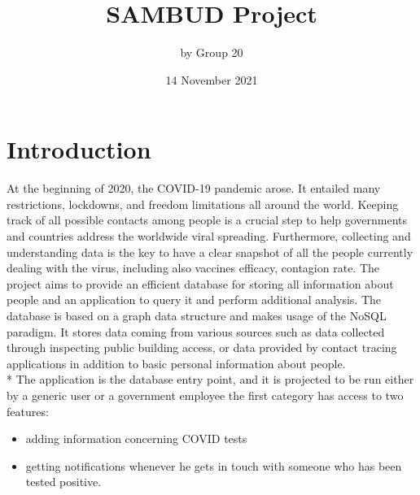 \documentclass[a4paper, 12p]{article}
\title{\Large{\textbf{SAMBUD Project}}}
\author{by Group 20}
\date{14 November 2021}
\begin{document}
\maketitle

\section{Introduction}
At the beginning of 2020, the COVID-19 pandemic arose. It entailed many restrictions, lockdowns, and freedom limitations all around the world. 
Keeping track of all possible contacts among people is a crucial step to help governments and countries address the worldwide viral spreading.
Furthermore, collecting and understanding data is the key to have a clear snapshot of all the people currently dealing with the virus, including also vaccines efficacy, contagion rate.
The project aims to provide an efficient database for storing all information about people and an application to query it and perform additional analysis. 
The database is based on a graph data structure and makes usage of the NoSQL paradigm. 
It stores data coming from various sources such as data collected through inspecting public building access, or data provided by contact tracing applications in addition to basic personal information about people. 
\\* The application is the database entry point, and it is projected to be run either by a generic user or a government employee 
the first category has access to two features:
\begin{itemize}
    \item adding information concerning COVID tests 
    \item getting notifications whenever he gets in touch with someone who has been tested positive.
\end{itemize}
\end{document}
